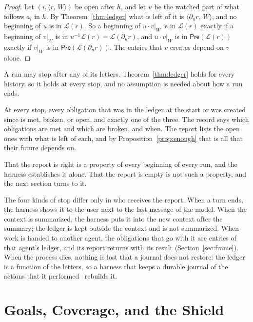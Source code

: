 \documentclass[acmsmall,nonacm,screen]{acmart}
\newcommand{\kw}[1]{\mathsf{#1}}
\newcommand{\ob}[2]{\langle #1,\, #2 \rangle}
\newcommand{\lang}[1]{\mathcal{L}(#1)}
\newcommand{\pre}[1]{\kw{Pre}(#1)}
\newcommand{\dv}[2]{\partial_{#1}#2}
\newcommand{\proj}[2]{#1|_{#2}}
\begin{document}
\begin{proof}
Let $(i, \ob{r}{W})$ be open after $h$, and let $u$ be the watched part of what follows
$a_i$ in $h$. By Theorem~\ref{thm:ledger} what is left of it is $\ob{\dv{u}{r}}{W}$, and no
beginning of $u$ is in $\lang{r}$. So a beginning of $u \cdot \proj{v}{W}$ is in $\lang{r}$
exactly if a beginning of $\proj{v}{W}$ is in $u^{-1}\lang{r} = \lang{\dv{u}{r}}$, and
$u \cdot \proj{v}{W}$ is in $\pre{\lang{r}}$ exactly if $\proj{v}{W}$ is in
$\pre{\lang{\dv{u}{r}}}$. The entries that $v$ creates depend on $v$ alone.
\end{proof}

A run may stop after any of its letters. Theorem~\ref{thm:ledger} holds for every history,
so it holds at every stop, and no assumption is needed about how a run ends.

\begin{corollary}
\label{cor:stop}
At every stop, every obligation that was in the ledger at the start or was created since is
met, broken, or open, and exactly one of the three. The record says which obligations are
met and which are broken, and when. The report lists the open ones with what is left of
each, and by Proposition~\ref{prop:enough} that is all that their future depends on.
\end{corollary}

That the report is right is a property of every beginning of every run, and the harness
establishes it alone. That the report is empty is not such a property, and the next section
turns to it.

The four kinds of stop differ only in who receives the report. When a turn ends, the harness
shows it to the user next to the last message of the model. When the context is summarized,
the harness puts it into the new context after the summary; the ledger is kept outside the
context and is not summarized. When work is handed to another agent, the obligations that
go with it are entries of that agent's ledger, and its report returns with its result
(Section~\ref{sec:frame}). When the process dies, nothing is lost that a journal does not
restore: the ledger is a function of the letters, so a harness that keeps a durable journal
of the actions that it performed~\cite{tpp8} rebuilds it.

\section{Goals, Coverage, and the Shield}
\label{sec:shield}
\end{document}

